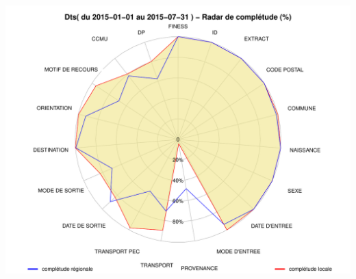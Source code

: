 \documentclass[]{article}
\begin{document}
\includegraphics{completude_files/figure-latex/finess-4.pdf}
\end{document}
